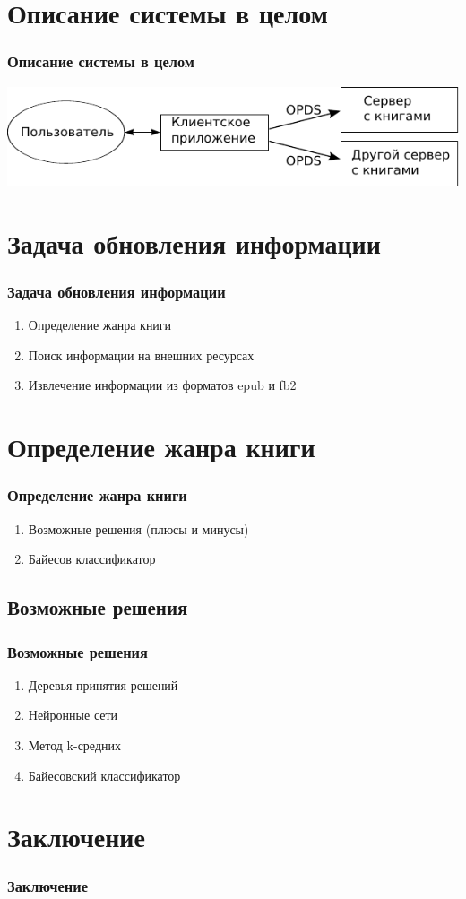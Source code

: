 \documentclass[handout]{beamer}
\begin{document}
\section{Описание системы в целом}
  \begin{frame}
    \frametitle{Описание системы в целом}

    \includegraphics{./head/scheme}
  \end{frame}

\section{Задача обновления информации}
  \begin{frame}
    \frametitle{Задача обновления информации}
  
    \begin{enumerate}
      \item Определение жанра книги
      \item Поиск информации на внешних ресурсах
      \item Извлечение информации из форматов epub и fb2 
    \end{enumerate}
  \end{frame}

\section{Определение жанра книги}
  \begin{frame}
    \frametitle{Определение жанра книги}  
    
    \begin{enumerate}
      \item Возможные решения (плюсы и минусы)
      \item Байесов классификатор
    \end{enumerate}        
  \end{frame}

\subsection{Возможные решения}
  \begin{frame}
    \frametitle{Возможные решения}  
    
    \begin{enumerate}
      \item Деревья принятия решений
      \item Нейронные сети
      \item Метод k-средних
      \item Байесовский классификатор
    \end{enumerate}        
  \end{frame}


\section{Заключение}
  \begin{frame}
    \frametitle{Заключение}
  
  \end{frame}
\end{document}
